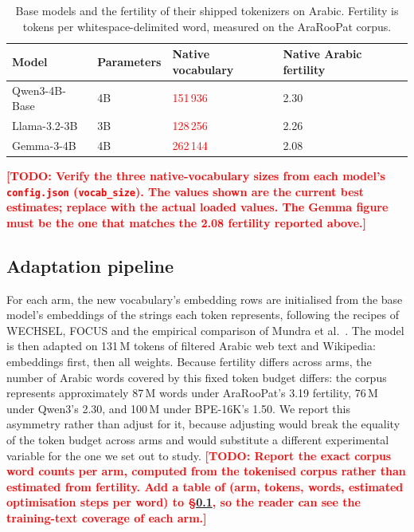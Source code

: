 \documentclass[a4paper,fleqn]{cas-sc}
\newcommand{\todo}[1]{\textcolor{red}{\textbf{[\textsc{TODO}: #1]}}}
\begin{document}
\begin{table}[t]
\centering
\caption{Base models and the fertility of their shipped tokenizers on Arabic. Fertility is tokens per whitespace-delimited word, measured on the AraRooPat corpus.}
\label{tab:models}
\begin{tabular}{@{}llll@{}}
\toprule
Model & Parameters & Native vocabulary & Native Arabic fertility \\
\midrule
Qwen3-4B-Base & 4B & \textcolor{red}{151\,936} & 2.30 \\
Llama-3.2-3B & 3B & \textcolor{red}{128\,256} & 2.26 \\
Gemma-3-4B & 4B & \textcolor{red}{262\,144} & 2.08 \\
\bottomrule
\end{tabular}
\vspace{2pt}
\raggedright\footnotesize
\todo{Verify the three native-vocabulary sizes from each model's \texttt{config.json} (\texttt{vocab\_size}). The values shown are the current best estimates; replace with the actual loaded values. The Gemma figure must be the one that matches the 2.08 fertility reported above.}
\end{table}

\subsection{Adaptation pipeline}
\label{sec:protocol:pipeline}

For each arm, the new vocabulary's embedding rows are initialised from the base model's embeddings of the strings each token represents, following the recipes of WECHSEL, FOCUS and the empirical comparison of Mundra et al.\ \citep{minixhofer2022wechsel,dobler2023focus,mundra2024empirical}. The model is then adapted on 131\,M tokens of filtered Arabic web text and Wikipedia: embeddings first, then all weights. Because fertility differs across arms, the number of Arabic words covered by this fixed token budget differs: the corpus represents approximately 87\,M words under AraRooPat's 3.19 fertility, 76\,M under Qwen3's 2.30, and 100\,M under BPE-16K's 1.50. We report this asymmetry rather than adjust for it, because adjusting would break the equality of the token budget across arms and would substitute a different experimental variable for the one we set out to study.
\todo{Report the exact corpus word counts per arm, computed from the tokenised corpus rather than estimated from fertility. Add a table of (arm, tokens, words, estimated optimisation steps per word) to \S\ref{sec:protocol:pipeline}, so the reader can see the training-text coverage of each arm.}
\end{document}
